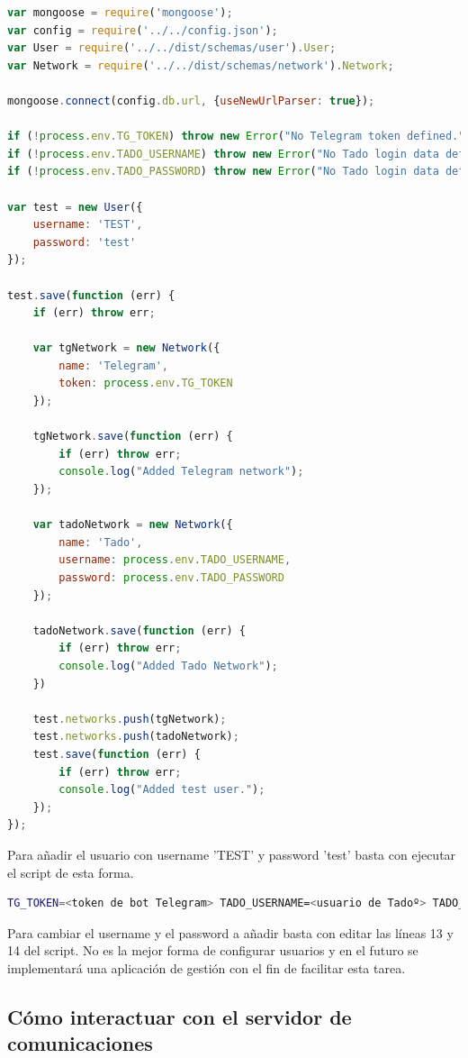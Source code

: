 \documentclass[spanish,12pt, a4paper, twoside]{paper}
\begin{document}
\begin{lstlisting}[language=JavaScript]
var mongoose = require('mongoose');
var config = require('../../config.json');
var User = require('../../dist/schemas/user').User;
var Network = require('../../dist/schemas/network').Network;

mongoose.connect(config.db.url, {useNewUrlParser: true});

if (!process.env.TG_TOKEN) throw new Error("No Telegram token defined.");
if (!process.env.TADO_USERNAME) throw new Error("No Tado login data defined.");
if (!process.env.TADO_PASSWORD) throw new Error("No Tado login data defined.");

var test = new User({
	username: 'TEST',
	password: 'test'
});

test.save(function (err) {
	if (err) throw err;

	var tgNetwork = new Network({
		name: 'Telegram',
		token: process.env.TG_TOKEN
	});

	tgNetwork.save(function (err) {
		if (err) throw err;
		console.log("Added Telegram network");
	});

	var tadoNetwork = new Network({
		name: 'Tado',
		username: process.env.TADO_USERNAME,
		password: process.env.TADO_PASSWORD
	});

	tadoNetwork.save(function (err) {
		if (err) throw err;
		console.log("Added Tado Network");
	})

	test.networks.push(tgNetwork);
	test.networks.push(tadoNetwork);
	test.save(function (err) {
		if (err) throw err;
		console.log("Added test user.");
	});
});
\end{lstlisting}

Para añadir el usuario con username 'TEST' y password 'test' basta con ejecutar el script de esta forma.

\begin{lstlisting}[language=sh]
TG_TOKEN=<token de bot Telegram> TADO_USERNAME=<usuario de Tadoº> TADO_PASSWORD=<contraseña de Tadoº> nodejs ./add-mocha-user.js
\end{lstlisting}

Para cambiar el username y el password a añadir basta con editar las líneas 13 y 14 del script. No es la mejor forma de configurar usuarios y en el futuro se implementará una aplicación de gestión con el fin de facilitar esta tarea.

\subsection{Cómo interactuar con el servidor de comunicaciones}
\end{document}
